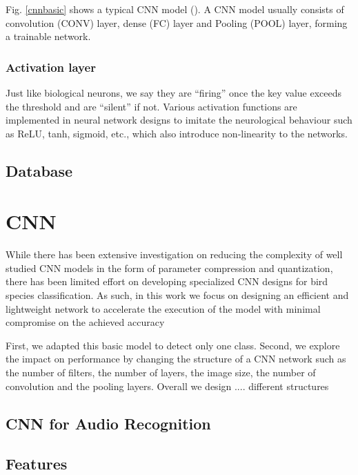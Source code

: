Fig. \ref{cnnbasic} shows a typical CNN model (\cite{Liu2017}).
A CNN model usually consists of convolution (CONV) layer, dense (FC) layer and Pooling (POOL) layer, forming a trainable network. 


\subsubsection*{Activation layer}

Just like biological neurons, we say they are “firing” once the key value exceeds the threshold and are “silent” if not. Various activation functions are implemented in neural network designs to imitate the neurological behaviour such as ReLU, tanh, sigmoid, etc., which also introduce non-linearity to the networks.


\subsection{Database}

\cite{Vellinga2015}




\section{CNN}

While there has been extensive investigation on reducing
the complexity of well studied CNN models in the form
of parameter compression and quantization, there has
been limited effort on developing specialized CNN designs for bird species classification.
As such, in this work we focus on designing an
efficient and lightweight network to accelerate the execution of
the model with minimal compromise on the achieved accuracy

First, we adapted this basic model to detect only one class. Second, we explore the impact on performance by changing the structure of a CNN network such as the number of filters, the number of layers, the image size, the number of convolution and the pooling layers. Overall we design .... different structures


\subsection{CNN for Audio Recognition}


\cite{Pellegrini2017}


\subsection{Features}

